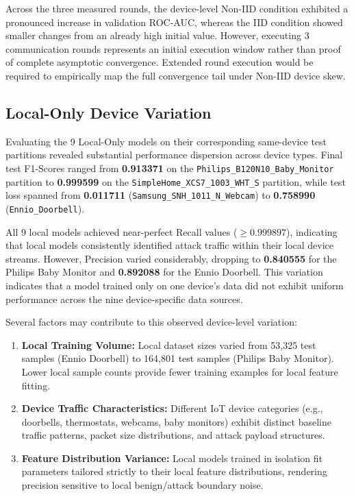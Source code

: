 \documentclass[11pt,a4paper]{article}
\begin{document}
Across the three measured rounds, the device-level Non-IID condition exhibited a pronounced increase in validation ROC-AUC, whereas the IID condition showed smaller changes from an already high initial value. However, executing 3 communication rounds represents an initial execution window rather than proof of complete asymptotic convergence. Extended round execution would be required to empirically map the full convergence tail under Non-IID device skew.

\subsection{Local-Only Device Variation}
Evaluating the 9 Local-Only models on their corresponding same-device test partitions revealed substantial performance dispersion across device types. Final test F1-Scores ranged from \textbf{0.913371} on the \texttt{Philips\_B120N10\_Baby\_Monitor} partition to \textbf{0.999599} on the \texttt{SimpleHome\_XCS7\_1003\_WHT\_S} partition, while test loss spanned from \textbf{0.011711} (\texttt{Samsung\_SNH\_1011\_N\_Webcam}) to \textbf{0.758990} (\texttt{Ennio\_Doorbell}).

All 9 local models achieved near-perfect Recall values ($\ge 0.999897$), indicating that local models consistently identified attack traffic within their local device streams. However, Precision varied considerably, dropping to \textbf{0.840555} for the Philips Baby Monitor and \textbf{0.892088} for the Ennio Doorbell. This variation indicates that a model trained only on one device's data did not exhibit uniform performance across the nine device-specific data sources.

Several factors may contribute to this observed device-level variation:

\begin{enumerate}
    \item \textbf{Local Training Volume:} Local dataset sizes varied from 53,325 test samples (Ennio Doorbell) to 164,801 test samples (Philips Baby Monitor). Lower local sample counts provide fewer training examples for local feature fitting.
    \item \textbf{Device Traffic Characteristics:} Different IoT device categories (e.g., doorbells, thermostats, webcams, baby monitors) exhibit distinct baseline traffic patterns, packet size distributions, and attack payload structures.
    \item \textbf{Feature Distribution Variance:} Local models trained in isolation fit parameters tailored strictly to their local feature distributions, rendering precision sensitive to local benign/attack boundary noise.
\end{enumerate}
\end{document}
